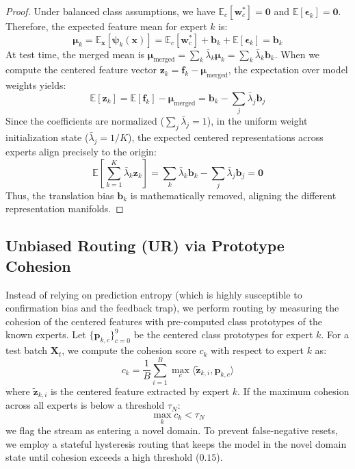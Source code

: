 \documentclass{article}
\theoremstyle{plain}
\theoremstyle{definition}
\theoremstyle{remark}
\begin{document}
\begin{proof}
Under balanced class assumptions, we have $\mathbb{E}_c[\mathbf{w}^*_c] = \mathbf{0}$ and $\mathbb{E}[\boldsymbol{\epsilon}_k] = \mathbf{0}$. Therefore, the expected feature mean for expert $k$ is:
\begin{equation*}
    \boldsymbol{\mu}_k = \mathbb{E}_{\mathbf{x}}[\boldsymbol{\psi}_k(\mathbf{x})] = \mathbb{E}_c[\mathbf{w}^*_c] + \mathbf{b}_k + \mathbb{E}[\boldsymbol{\epsilon}_k] = \mathbf{b}_k
\end{equation*}
At test time, the merged mean is $\boldsymbol{\mu}_{\text{merged}} = \sum_k \bar{\lambda}_k \boldsymbol{\mu}_k = \sum_k \bar{\lambda}_k \mathbf{b}_k$. When we compute the centered feature vector $\mathbf{z}_k = \mathbf{f}_k - \boldsymbol{\mu}_{\text{merged}}$, the expectation over model weights yields:
\begin{equation*}
    \mathbb{E}[\mathbf{z}_k] = \mathbb{E}[\mathbf{f}_k] - \boldsymbol{\mu}_{\text{merged}} = \mathbf{b}_k - \sum_{j} \bar{\lambda}_j \mathbf{b}_j
\end{equation*}
Since the coefficients are normalized ($\sum_j \bar{\lambda}_j = 1$), in the uniform weight initialization state ($\bar{\lambda}_j = 1/K$), the expected centered representations across experts align precisely to the origin:
\begin{equation*}
    \mathbb{E}\left[ \sum_{k=1}^K \bar{\lambda}_k \mathbf{z}_k \right] = \sum_k \bar{\lambda}_k \mathbf{b}_k - \sum_j \bar{\lambda}_j \mathbf{b}_j = \mathbf{0}
\end{equation*}
Thus, the translation bias $\mathbf{b}_k$ is mathematically removed, aligning the different representation manifolds.
\end{proof}

\subsection{Unbiased Routing (UR) via Prototype Cohesion}
Instead of relying on prediction entropy (which is highly susceptible to confirmation bias and the feedback trap), we perform routing by measuring the cohesion of the centered features with pre-computed class prototypes of the known experts. Let $\{\mathbf{p}_{k,c}\}_{c=0}^9$ be the centered class prototypes for expert $k$. For a test batch $\mathbf{X}_t$, we compute the cohesion score $c_k$ with respect to expert $k$ as:
\begin{equation}
    c_k = \frac{1}{B} \sum_{i=1}^B \max_{c} \langle \tilde{\mathbf{z}}_{k,i}, \mathbf{p}_{k,c} \rangle
\end{equation}
where $\tilde{\mathbf{z}}_{k,i}$ is the centered feature extracted by expert $k$. If the maximum cohesion across all experts is below a threshold $\tau_N$:
\begin{equation}
    \max_k c_k < \tau_N
\end{equation}
we flag the stream as entering a novel domain. To prevent false-negative resets, we employ a stateful hysteresis routing that keeps the model in the novel domain state until cohesion exceeds a high threshold ($0.15$).
\end{document}

